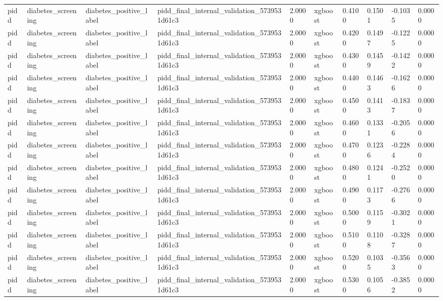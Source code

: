 \begin{tabular}{llllllllll}
pidd & diabetes\_screening & diabetes\_positive\_label & pidd\_final\_internal\_validation\_5739531d61c3 & 2.0000 & xgboost & 0.4100 & 0.1501 & -0.1035 & 0.0000 \\
pidd & diabetes\_screening & diabetes\_positive\_label & pidd\_final\_internal\_validation\_5739531d61c3 & 2.0000 & xgboost & 0.4200 & 0.1497 & -0.1225 & 0.0000 \\
pidd & diabetes\_screening & diabetes\_positive\_label & pidd\_final\_internal\_validation\_5739531d61c3 & 2.0000 & xgboost & 0.4300 & 0.1459 & -0.1422 & 0.0000 \\
pidd & diabetes\_screening & diabetes\_positive\_label & pidd\_final\_internal\_validation\_5739531d61c3 & 2.0000 & xgboost & 0.4400 & 0.1463 & -0.1626 & 0.0000 \\
pidd & diabetes\_screening & diabetes\_positive\_label & pidd\_final\_internal\_validation\_5739531d61c3 & 2.0000 & xgboost & 0.4500 & 0.1413 & -0.1837 & 0.0000 \\
pidd & diabetes\_screening & diabetes\_positive\_label & pidd\_final\_internal\_validation\_5739531d61c3 & 2.0000 & xgboost & 0.4600 & 0.1331 & -0.2056 & 0.0000 \\
pidd & diabetes\_screening & diabetes\_positive\_label & pidd\_final\_internal\_validation\_5739531d61c3 & 2.0000 & xgboost & 0.4700 & 0.1236 & -0.2284 & 0.0000 \\
pidd & diabetes\_screening & diabetes\_positive\_label & pidd\_final\_internal\_validation\_5739531d61c3 & 2.0000 & xgboost & 0.4800 & 0.1241 & -0.2520 & 0.0000 \\
pidd & diabetes\_screening & diabetes\_positive\_label & pidd\_final\_internal\_validation\_5739531d61c3 & 2.0000 & xgboost & 0.4900 & 0.1173 & -0.2766 & 0.0000 \\
pidd & diabetes\_screening & diabetes\_positive\_label & pidd\_final\_internal\_validation\_5739531d61c3 & 2.0000 & xgboost & 0.5000 & 0.1159 & -0.3021 & 0.0000 \\
pidd & diabetes\_screening & diabetes\_positive\_label & pidd\_final\_internal\_validation\_5739531d61c3 & 2.0000 & xgboost & 0.5100 & 0.1108 & -0.3287 & 0.0000 \\
pidd & diabetes\_screening & diabetes\_positive\_label & pidd\_final\_internal\_validation\_5739531d61c3 & 2.0000 & xgboost & 0.5200 & 0.1035 & -0.3563 & 0.0000 \\
pidd & diabetes\_screening & diabetes\_positive\_label & pidd\_final\_internal\_validation\_5739531d61c3 & 2.0000 & xgboost & 0.5300 & 0.1056 & -0.3852 & 0.0000 \\

\end{tabular}
